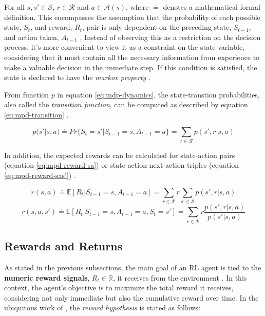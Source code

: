 For all $s, s' \in \mathcal{S}$, $r \in \mathcal{R}$ and $a \in \mathcal{A}(s)$, where $\doteq$ denotes a mathematical formal definition. This encompasses the assumption that the probability of each possible state, $S_t$, and reward, $R_t$, pair is only dependent on the preceding state, $S_{t-1}$, and action taken, $A_{t-1}$ \cite{suttonReinforcementLearningIntroduction2014}. Instead of observing this as a restriction on the decision process, it's more convenient to view it as a constraint on the state variable, considering that it must contain all the necessary information from experience to make a valuable decision in the immediate step. If this condition is satisfied, the state is declared to have the \textit{markov property} \cite{suttonReinforcementLearningIntroduction2014}. \par
From function $p$ in equation \ref{eq:mdp-dynamics}, the state-transtion probabilities, also called the \textit{transition function}, can be computed as described by equation \ref{eq:mpd-transition} \cite{suttonReinforcementLearningIntroduction2014, moralesGrokkingDeepReinforcement2020}.

\begin{equation} \label{eq:mpd-transition}
	p(s'|s,a) \doteq Pr\{S_t = s'|S_{t-1} = s, A_{t-1} = a\} = \sum_{r \in \mathcal{R}} p(s',r|s,a)
\end{equation}

In addition, the expected rewards can be calculated for state-action pairs (equation \ref{eq:mpd-reward-sa}) or state-action-next-action triples (equation \ref{eq:mpd-reward-sas'}) \cite{suttonReinforcementLearningIntroduction2014, moralesGrokkingDeepReinforcement2020}.

\begin{equation} \label{eq:mpd-reward-sa}
	r(s,a) \doteq \mathbb{E}[R_t | S_{t-1} = s, A_{t-1} = a] = \sum_{r \in \mathcal{R}} r \sum_{s' \in \mathcal{S}} p(s', r|s,a)
\end{equation}
\begin{equation} \label{eq:mpd-reward-sas'}
	r(s,a,s') \doteq \mathbb{E}[R_t | S_{t-1} = s, A_{t-1} = a, S_t = s'] = \sum_{r \in \mathcal{R}} r \frac{p(s',r|s,a)}{p(s'|s,a)}
\end{equation}

\subsection{Rewards and Returns}

As stated in the previous subsections, the main goal of an \ac{RL} agent is tied to the \textbf{numeric reward signals}, $R_t \in \mathbb{R}$, it receives from the environment \cite{suttonReinforcementLearningIntroduction2014}. In this context, the agent's objective is to maximize the total reward it receives, considering not only immediate but also the cumulative reward over time. In the ubiquitous work of \cite{suttonReinforcementLearningIntroduction2014}, the \textit{reward hypothesis} is stated as follows:

